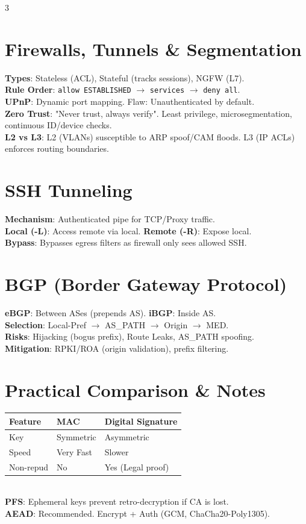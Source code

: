 \documentclass[10pt,landscape]{article}
\begin{document}
\begin{multicols*}{3}
\section*{Firewalls, Tunnels \& Segmentation}
\textbf{Types}: Stateless (ACL), Stateful (tracks sessions), NGFW (L7). \\
\textbf{Rule Order}: \texttt{allow ESTABLISHED} $\to$ \texttt{services} $\to$ \texttt{deny all}. \\
\textbf{UPnP}: Dynamic port mapping. Flaw: Unauthenticated by default. \\
\textbf{Zero Trust}: "Never trust, always verify". Least privilege, microsegmentation, continuous ID/device checks. \\
\textbf{L2 vs L3}: L2 (VLANs) susceptible to ARP spoof/CAM floods. L3 (IP ACLs) enforces routing boundaries.

\section*{SSH Tunneling}
\textbf{Mechanism}: Authenticated pipe for TCP/Proxy traffic. \\
\textbf{Local (-L)}: Access remote via local. \textbf{Remote (-R)}: Expose local. \\
\textbf{Bypass}: Bypasses egress filters as firewall only sees allowed SSH.

\section*{BGP (Border Gateway Protocol)}
\textbf{eBGP}: Between ASes (prepends AS). \textbf{iBGP}: Inside AS. \\
\textbf{Selection}: Local-Pref $\to$ AS\_PATH $\to$ Origin $\to$ MED. \\
\textbf{Risks}: Hijacking (bogus prefix), Route Leaks, AS\_PATH spoofing. \\
\textbf{Mitigation}: RPKI/ROA (origin validation), prefix filtering.

\section*{Practical Comparison \& Notes}
\begin{tabular}{@{}lll@{}} \toprule
Feature & MAC & Digital Signature \\ \midrule
Key & Symmetric & Asymmetric \\
Speed & Very Fast & Slower \\
Non-repud & No & Yes (Legal proof) \\ \bottomrule
\end{tabular} \\
\textbf{PFS}: Ephemeral keys prevent retro-decryption if CA is lost. \\
\textbf{AEAD}: Recommended. Encrypt + Auth (GCM, ChaCha20-Poly1305).


\end{multicols*}
\end{document}
